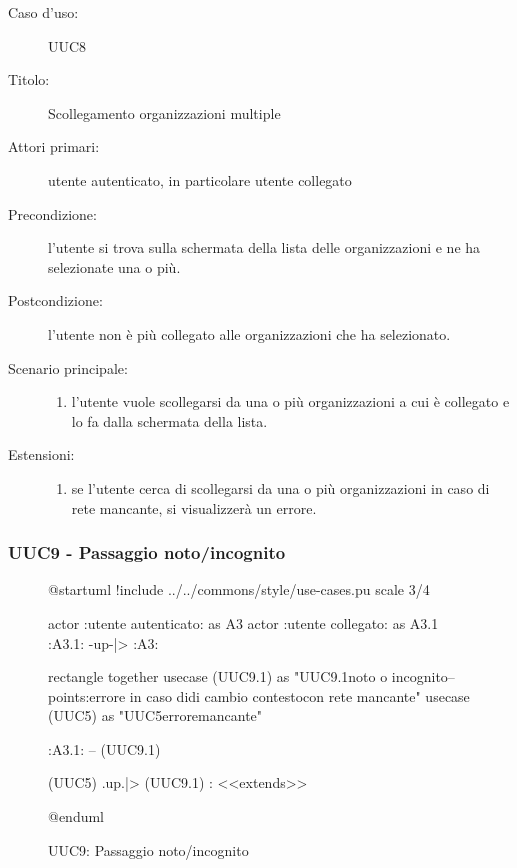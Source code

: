 \documentclass[casi-duso]{subfiles}
\begin{document}
\begin{description}
  \item[Caso d’uso:] UUC8
  \item[Titolo:] Scollegamento organizzazioni multiple
  \item[Attori primari:] utente autenticato, in particolare utente collegato
  \item[Precondizione:] l'utente si trova sulla schermata della lista delle organizzazioni e ne ha selezionate una o più.
  \item[Postcondizione:] l'utente non è più collegato alle organizzazioni che ha selezionato.
  \item[Scenario principale:]
        \begin{enumerate}
          \item l'utente vuole scollegarsi da una o più organizzazioni a cui è collegato e lo fa dalla schermata della lista.
        \end{enumerate}
  \item[Estensioni:]
        \begin{enumerate}
          \item se l'utente cerca di scollegarsi da una o più organizzazioni in caso di rete mancante, si visualizzerà un errore.
        \end{enumerate}
\end{description}

\subsubsection{UUC9 - Passaggio noto/incognito}%
\label{subsub:UUC9utente}

\begin{figure}[h!] 
  \centering 
  \begin{plantuml}
  @startuml
  !include ../../commons/style/use-cases.pu
  scale 3/4

  actor :utente autenticato: as A3
  actor :utente collegato: as A3.1
  :A3.1: -up-|> :A3:

  rectangle {
    together {
      usecase (UUC9.1) as "UUC9.1\nScelta noto o incognito\n--\nExtension points:\nVisualizzazione errore in caso di\noperazione di cambio contesto\n con rete mancante"
      usecase (UUC5) as "UUC5\nVisualizzazione errore\nrete mancante"
    }
  }

  :A3.1: -- (UUC9.1)

  (UUC5) .up.|> (UUC9.1) : <<extends>>

  @enduml
  \end{plantuml} 
  \caption{UUC9: Passaggio noto/incognito} 
  \label{fig:uuc9} 
\end{figure}
\end{document}
